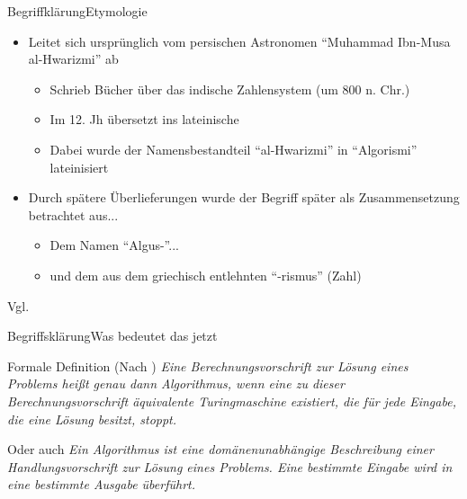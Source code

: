 
\begin{frame}{Begriffklärung}{Etymologie}
    \begin{itemize}[<+->]
        \item Leitet sich ursprünglich vom persischen Astronomen "`Muhammad Ibn-Musa al-Hwarizmi"' ab
        \begin{itemize}
            \item Schrieb Bücher über das indische Zahlensystem (um 800 n. Chr.)
            \item Im 12. Jh übersetzt ins lateinische
            \item Dabei wurde der Namensbestandteil "`al-Hwarizmi"' in "`Algorismi"' lateinisiert
        \end{itemize}
        \item Durch spätere Überlieferungen wurde der Begriff später als Zusammensetzung betrachtet aus...
        \begin{itemize}
            \item Dem Namen "`Algus-"'...
            \item und dem aus dem griechisch entlehnten "`-rismus"' (Zahl)
        \end{itemize}
    \end{itemize}
    
    Vgl. \cite{wiki:algo}
\end{frame}

\begin{frame}{Begriffsklärung}{Was bedeutet das jetzt}
    \begin{block}{Formale Definition (Nach \cite{wiki:algo})}
    \textit{Eine Berechnungsvorschrift zur Lösung eines Problems heißt genau dann Algorithmus, wenn eine zu dieser Berechnungsvorschrift äquivalente Turingmaschine existiert, die für jede Eingabe, die eine Lösung besitzt, stoppt.}
    \end{block}
    \pause
    \begin{alertblock}{Oder auch}
    \textit{Ein Algorithmus ist eine domänenunabhängige Beschreibung einer Handlungsvorschrift zur Lösung eines Problems. Eine bestimmte Eingabe wird in eine bestimmte Ausgabe überführt.}
    \end{alertblock}
\end{frame}

